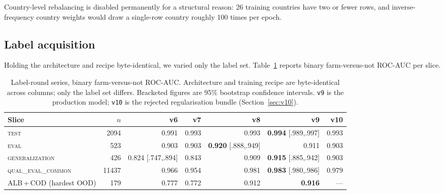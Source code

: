 \documentclass[11pt,a4paper]{article}
\newcommand{\code}[1]{\texttt{\small #1}}
\begin{document}
Country-level rebalancing is disabled permanently for a structural reason: 26
training countries have two or fewer rows, and inverse-frequency country weights
would draw a single-row country roughly 100 times per epoch.

\subsection{Label acquisition}
\label{sec:labelrounds}

Holding the architecture and recipe byte-identical, we varied only the label
set. Table~\ref{tab:labelrounds} reports binary farm-versus-not ROC-AUC per
slice.

\begin{table}[t]
\centering
\small
\caption{Label-round series, binary farm-versus-not ROC-AUC. Architecture and
training recipe are byte-identical across columns; only the label set differs.
Bracketed figures are 95\% bootstrap confidence intervals. \code{v9} is the
production model; \code{v10} is the rejected regularisation bundle
(Section~\ref{sec:v10}).}
\label{tab:labelrounds}
\begin{tabular}{lrrrrrr}
\toprule
Slice & $n$ & v6 & v7 & v8 & v9 & v10 \\
\midrule
\textsc{test}              & \num{2094}  & 0.991 & 0.993 & 0.993 & \textbf{0.994} [.989,.997] & 0.993 \\
\textsc{eval}              & 523         & 0.903 & 0.903 & \textbf{0.920} [.888,.949] & 0.911 & 0.903 \\
\textsc{generalization}    & 426         & 0.824 [.747,.894] & 0.843 & 0.909 & \textbf{0.915} [.885,.942] & 0.903 \\
\textsc{qual\_eval\_common} & \num{11437} & 0.966 & 0.954 & 0.981 & \textbf{0.983} [.980,.986] & 0.979 \\
ALB\,+\,COD (hardest OOD)   & 179         & 0.777 & 0.772 & 0.912 & \textbf{0.916} & --- \\
\bottomrule
\end{tabular}
\end{table}
\end{document}
